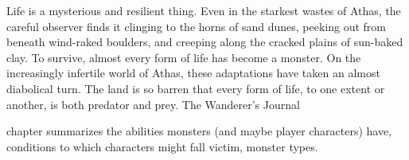 {Life is a mysterious and resilient thing. Even in the starkest wastes of Athas, the careful observer finds it clinging to the horns of sand dunes, peeking out from beneath wind-raked boulders, and creeping along the cracked plains of sun-baked clay.
To survive, almost every form of life has become a monster. On the increasingly infertile world of Athas, these adaptations have taken an almost diabolical turn. The land is so barren that every form of life, to one extent or another, is both predator and prey.}
{The Wanderer's Journal}

 chapter summarizes the abilities monsters (and maybe player characters) have, conditions to which characters might fall victim, monster types.






